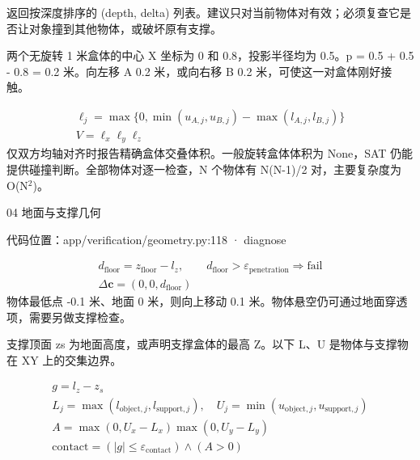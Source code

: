 \documentclass[10pt,a4paper]{article}
\begin{document}
返回按深度排序的 (depth, delta) 列表。建议只对当前物体对有效；必须复查它是否让对象撞到其他物体，或破坏原有支撑。\par
\par{}
两个无旋转 1 米盒体的中心 X 坐标为 0 和 0.8，投影半径均为 0.5。p = 0.5 + 0.5 - 0.8 = 0.2 米。向左移 A 0.2 米，或向右移 B 0.2 米，可使这一对盒体刚好接触。\par
\par{}
\[\begin{gathered}\ell_j=\max\{0,\min(u_{A,j},u_{B,j})-\max(l_{A,j},l_{B,j})\}\\ V=\ell_x\ell_y\ell_z\end{gathered}\]
仅双方均轴对齐时报告精确盒体交叠体积。一般旋转盒体体积为 None，SAT 仍能提供碰撞判断。全部物体对逐一检查，N 个物体有 N(N-1)/2 对，主要复杂度为 O(N\( {}^2 \))。\par
\clearpage
{\color{ink}\LARGE 04 地面与支撑几何\par}\vspace{5pt}
{\footnotesize\color{ink} 代码位置：app/verification/geometry.py:118 · diagnose\par}
\par{}
\[\begin{gathered}d_{\mathrm{floor}}=z_{\mathrm{floor}}-l_z,\qquad d_{\mathrm{floor}}>\varepsilon_{\mathrm{penetration}}\Rightarrow\mathrm{fail}\\ \Delta\mathbf c=(0,0,d_{\mathrm{floor}})\end{gathered}\]
物体最低点 -0.1 米、地面 0 米，则向上移动 0.1 米。物体悬空仍可通过地面穿透项，需要另做支撑检查。\par
\par{}
支撑顶面 zs 为地面高度，或声明支撑盒体的最高 Z。以下 L、U 是物体与支撑物在 XY 上的交集边界。\par
\[\begin{gathered}g=l_z-z_s\\ L_j=\max(l_{\mathrm{object},j},l_{\mathrm{support},j}),\quad U_j=\min(u_{\mathrm{object},j},u_{\mathrm{support},j})\\ A=\max(0,U_x-L_x)\max(0,U_y-L_y)\\ \mathrm{contact}=(|g|\le\varepsilon_{\mathrm{contact}})\land(A>0)\end{gathered}\]
\end{document}
